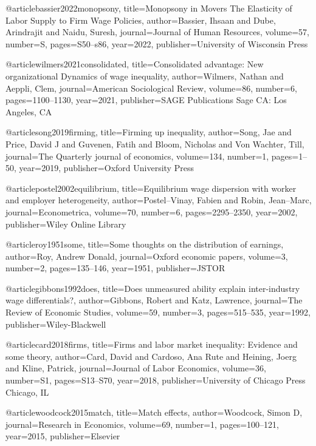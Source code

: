 @article{bassier2022monopsony,
  title={Monopsony in Movers The Elasticity of Labor Supply to Firm Wage Policies},
  author={Bassier, Ihsaan and Dube, Arindrajit and Naidu, Suresh},
  journal={Journal of Human Resources},
  volume={57},
  number={S},
  pages={S50--s86},
  year={2022},
  publisher={University of Wisconsin Press}
}

@article{wilmers2021consolidated,
  title={Consolidated advantage: New organizational Dynamics of wage inequality},
  author={Wilmers, Nathan and Aeppli, Clem},
  journal={American Sociological Review},
  volume={86},
  number={6},
  pages={1100--1130},
  year={2021},
  publisher={SAGE Publications Sage CA: Los Angeles, CA}
}

@article{song2019firming,
  title={Firming up inequality},
  author={Song, Jae and Price, David J and Guvenen, Fatih and Bloom, Nicholas and Von Wachter, Till},
  journal={The Quarterly journal of economics},
  volume={134},
  number={1},
  pages={1--50},
  year={2019},
  publisher={Oxford University Press}
}

@article{postel2002equilibrium,
  title={Equilibrium wage dispersion with worker and employer heterogeneity},
  author={Postel--Vinay, Fabien and Robin, Jean--Marc},
  journal={Econometrica},
  volume={70},
  number={6},
  pages={2295--2350},
  year={2002},
  publisher={Wiley Online Library}
}

@article{roy1951some,
  title={Some thoughts on the distribution of earnings},
  author={Roy, Andrew Donald},
  journal={Oxford economic papers},
  volume={3},
  number={2},
  pages={135--146},
  year={1951},
  publisher={JSTOR}
}

@article{gibbons1992does,
  title={Does unmeasured ability explain inter-industry wage differentials?},
  author={Gibbons, Robert and Katz, Lawrence},
  journal={The Review of Economic Studies},
  volume={59},
  number={3},
  pages={515--535},
  year={1992},
  publisher={Wiley-Blackwell}
}

@article{card2018firms,
  title={Firms and labor market inequality: Evidence and some theory},
  author={Card, David and Cardoso, Ana Rute and Heining, Joerg and Kline, Patrick},
  journal={Journal of Labor Economics},
  volume={36},
  number={S1},
  pages={S13--S70},
  year={2018},
  publisher={University of Chicago Press Chicago, IL}
}

@article{woodcock2015match,
  title={Match effects},
  author={Woodcock, Simon D},
  journal={Research in Economics},
  volume={69},
  number={1},
  pages={100--121},
  year={2015},
  publisher={Elsevier}
}

